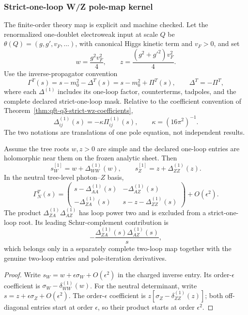 \subsubsection*{Strict-one-loop W/Z pole-map kernel}

The finite-order theory map is explicit and machine checked.  Let the
renormalized one-doublet electroweak input at scale \(Q\) be
\(\theta(Q)=(g,g',v_F,\ldots)\), with canonical Higgs kinetic term and
\(v_F>0\), and set
\[
w=\frac{g^2v_F^2}{4},\qquad
z=\frac{(g^2+g'^2)v_F^2}{4}.
\]
Use the inverse-propagator convention
\[
\Gamma^T(s)=s-m_0^2-\Delta^T(s)
=s-m_0^2+\Pi^T(s),\qquad \Delta^T=-\Pi^T,
\]
where each \(\Delta^{(1)}\) includes its one-loop factor,
counterterms, tadpoles, and the complete declared strict-one-loop mask.
Relative to the coefficient convention of
Theorem~\ref{thm:qft-q3-strict-wz-coefficients},
\[
\Delta_{ij}^{(1)}(s)=-\kappa\Pi_{ij}^{(1)}(s),
\qquad \kappa=(16\pi^2)^{-1}.
\]
The two notations are translations of one pole equation, not independent
results.

\begin{proposition}
\label{prop:strict-one-loop-wz-map}
Assume the tree roots \(w,z>0\) are simple and the declared one-loop entries
are holomorphic near them on the frozen analytic sheet.  Then
\[
s_W^{[1]}=w+\Delta_{WW}^{(1)}(w),\qquad
s_Z^{[1]}=z+\Delta_{ZZ}^{(1)}(z).
\]
In the neutral tree-level photon--\(Z\) basis,
\[
\Gamma_N^T(s)=
\begin{pmatrix}
s-\Delta_{AA}^{(1)}(s)&-\Delta_{AZ}^{(1)}(s)\\
-\Delta_{ZA}^{(1)}(s)&s-z-\Delta_{ZZ}^{(1)}(s)
\end{pmatrix}+O(\epsilon^2).
\]
The product
\(\Delta_{ZA}^{(1)}\Delta_{AZ}^{(1)}\) has loop power two and is excluded
from a strict-one-loop root.  Its leading Schur-complement contribution is
\[
-\frac{\Delta_{ZA}^{(1)}(s)\Delta_{AZ}^{(1)}(s)}{s},
\]
which belongs only in a separately complete two-loop map together with the
genuine two-loop entries and pole-iteration derivatives.
\end{proposition}

\begin{proof}
Write \(s_W=w+\epsilon\sigma_W+O(\epsilon^2)\) in the charged inverse
entry.  Its order-\(\epsilon\) coefficient is
\(\sigma_W-\delta_{WW}^{(1)}(w)\).  For the neutral determinant, write
\(s=z+\epsilon\sigma_Z+O(\epsilon^2)\).  The order-\(\epsilon\) coefficient
is \(z[\sigma_Z-\delta_{ZZ}^{(1)}(z)]\); both off-diagonal entries start at
order \(\epsilon\), so their product starts at order \(\epsilon^2\).
\end{proof}

